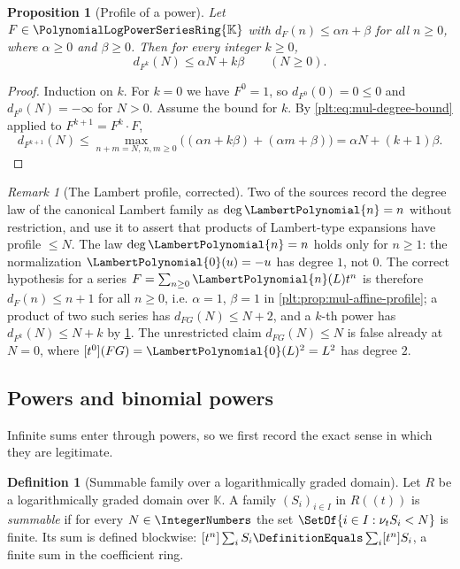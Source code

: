 \documentclass[11pt,oneside]{article}
\theoremstyle{plain}
\newtheorem{proposition}[theorem]{Proposition}
\theoremstyle{definition}
\newtheorem{definition}[theorem]{Definition}
\theoremstyle{remark}
\newtheorem{remark}[theorem]{Remark}
\newcommand{\K}{\mathbb{K}}
\newcommand{\PLpow}{\PolynomialLogPowerSeriesRing{\K}}   %
\newcommand{\ordt}{\nu_{t}}                              %
\newcommand{\LamP}[1]{\LambertPolynomial{#1}}
\newcommand{\dprofile}[1]{d_{#1}}                        %
\begin{document}
\begin{proposition}[Profile of a power]
\label{plt:prop:mul-power-profile}
Let $F\in\PLpow$ with $\dprofile{F}(n)\le\alpha n+\beta$ for all $n\ge0$,
where $\alpha\ge0$ and $\beta\ge0$.  Then for every integer $k\ge0$,
\begin{equation}\label{plt:eq:mul-power-profile}
 \dprofile{F^k}(N)\le\alpha N+k\beta
 \qquad(N\ge0).
\end{equation}
\end{proposition}

\begin{proof}
Induction on $k$.  For $k=0$ we have $F^0=1$, so $\dprofile{F^0}(0)=0\le0$
and $\dprofile{F^0}(N)=-\infty$ for $N>0$.  Assume the bound for $k$.  By
\eqref{plt:eq:mul-degree-bound} applied to $F^{k+1}=F^k\cdot F$,
\[
 \dprofile{F^{k+1}}(N)
 \le\max_{n+m=N,\ n,m\ge0}\bigl((\alpha n+k\beta)+(\alpha m+\beta)\bigr)
 =\alpha N+(k+1)\beta .
\]
\end{proof}

\begin{remark}[The Lambert profile, corrected]
\label{plt:rmk:mul-lambert-profile}
Two of the sources record the degree law of the canonical Lambert family as
$\deg\LamP{n}=n$ without restriction, and use it to assert that products of
Lambert-type expansions have profile $\le N$.  The law
$\deg\LamP{n}=n$ holds only for $n\ge1$: the normalization
$\LamP{0}(u)=-u$ has degree $1$, not $0$.  The correct hypothesis for a
series $F=\sum_{n\ge0}\LamP{n}(L)t^n$ is therefore
$\dprofile{F}(n)\le n+1$ for all $n\ge0$, i.e. $\alpha=1$, $\beta=1$ in
\cref{plt:prop:mul-affine-profile}; a product of two such series has
$\dprofile{FG}(N)\le N+2$, and a $k$-th power has
$\dprofile{F^k}(N)\le N+k$ by \cref{plt:prop:mul-power-profile}.  The
unrestricted claim $\dprofile{FG}(N)\le N$ is false already at $N=0$, where
$[t^0](FG)=\LamP{0}(L)^2=L^2$ has degree $2$.
\end{remark}

\subsection{Powers and binomial powers}
\label{plt:sec:mul-powers}

Infinite sums enter through powers, so we first record the exact sense in
which they are legitimate.

\begin{definition}[Summable family over a logarithmically graded domain]
\label{plt:def:mul-summable}
Let $R$ be a logarithmically graded domain over $\K$.  A family
$(S_i)_{i\in I}$ in $R((t))$ is \emph{summable} if for every
$N\in\IntegerNumbers$ the set $\SetOf{i\in I:\ordt S_i<N}$ is finite.  Its
sum is defined blockwise:
$[t^n]\sum_{i}S_i\DefinitionEquals\sum_i[t^n]S_i$, a finite sum in the
coefficient ring.
\end{definition}
\end{document}
